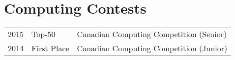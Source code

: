 \documentclass[]{deedy-resume-openfont}
\begin{document}
\begin{minipage}[t]{0.66\textwidth}

\section{Computing Contests} 
\begin{tabular}{rll}
2015         & Top-50 & Canadian Computing Competition (Senior)\\
2014         & First Place  & Canadian Computing Competition (Junior)\\

\end{tabular}
\sectionsep

\sectionsep




\end{minipage} 
\end{document}
